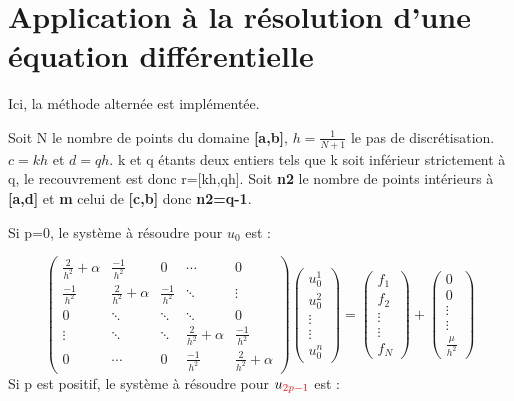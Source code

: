 \documentclass[a4paper,12pt,twoside]{report}
\begin{document}
 


\chapter{Application à la résolution d'une équation différentielle}
 
 Ici, la méthode alternée est implémentée.

Soit N le nombre de points du domaine \textbf{[a,b]}, $h=\frac{1}{ N+1} $   le pas de discrétisation.
$c=kh$ et $ d=qh$. k et q étants deux entiers tels que k soit inférieur strictement à q, le recouvrement est donc r=[kh,qh].
Soit \textbf{n2} le nombre de points intérieurs à \textbf{[a,d]} et \textbf{m} celui de \textbf{[c,b] }donc \textbf{n2=q-1}. 

Si p=0, le système à résoudre pour $u_{0}$ est :

\[
\begin{pmatrix}
   \frac{2}{h^{2}} +\alpha & \frac{-1}{h^{2}}  &0 &\cdots & 0 \\
   \frac{-1}{h^{2}}  & \frac{2}{h^{2}}  +\alpha & \frac{-1}{h^{2}} & \ddots &  \vdots \\ 0  & \ddots &  \ddots &  \ddots & 0\\   \vdots & \ddots & \ddots  & \frac{2}{h^{2}} +\alpha &  \frac{-1}{h^{2}}\\
 0 & \cdots & 0 & \frac{-1}{h^{2}} & \frac{2}{h^{2}} +\alpha
\end{pmatrix}
\begin{pmatrix}
  u_{0}^{1} \\u_{0}^{2}\\  \vdots\\ \vdots\\ u_{0}^{n}
\end{pmatrix} = \begin{pmatrix}
  f_{1} \\ f_{2} \\ \vdots\\\vdots\\f_{N}
\end{pmatrix} +  \begin{pmatrix}0\\ 0 \\   \vdots\\
   \vdots\\
 \frac{\mu}{h^{2}} 
\end{pmatrix} \]
Si  p est positif, le système à résoudre pour 
$u_{\color[rgb]{1,0,0}2p-1} $ est :
\end{document}
